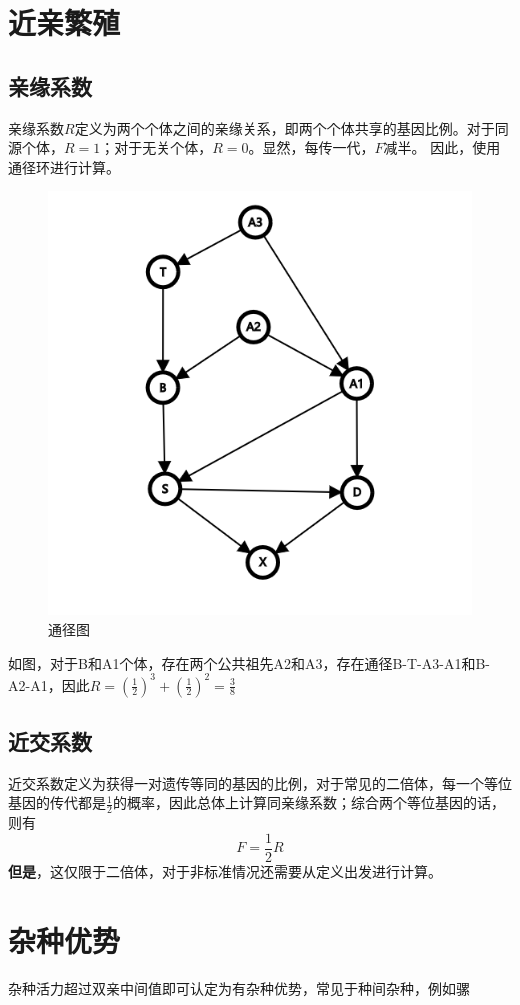 \documentclass[a4paper, 12pt]{report}
\begin{document}
  \section{近亲繁殖}
  \subsection{亲缘系数}
  亲缘系数$R$定义为两个个体之间的亲缘关系，即两个个体共享的基因比例。对于同源个体，$R=1$；对于无关个体，$R=0$。显然，每传一代，$F$减半。
  因此，使用通径环进行计算。
  \begin{figure}
    \centering
    \includegraphics[width=1\textwidth]{近交图.png}
    \caption{通径图}
    \label{近交图}
  \end{figure}  
  如图，对于B和A1个体，存在两个公共祖先A2和A3，存在通径B-T-A3-A1和B-A2-A1，因此\(R=(\frac{1}{2})^3+(\frac{1}{2})^2=\frac{3}{8}\)
  \subsection{近交系数}
  近交系数定义为获得一对遗传等同的基因的比例，对于常见的二倍体，每一个等位基因的传代都是\(\frac{1}{2}\)的概率，因此总体上计算同亲缘系数；综合两个等位基因的话，则有
  \[F=\frac{1}{2}R\]
  \textbf{但是}，这仅限于二倍体，对于非标准情况还需要从定义出发进行计算。
  \section{杂种优势}
  杂种活力超过双亲中间值即可认定为有杂种优势，常见于种间杂种，例如骡
\end{document}
